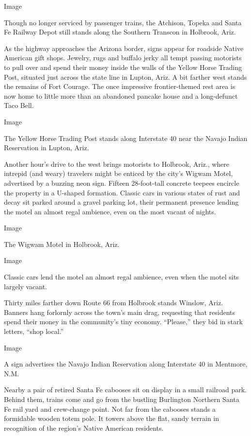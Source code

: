 Image

Though no longer serviced by passenger trains, the Atchison, Topeka and
Santa Fe Railway Depot still stands along the Southern Transcon in
Holbrook, Ariz.

As the highway approaches the Arizona border, signs appear for roadside
Native American gift shops. Jewelry, rugs and buffalo jerky all tempt
passing motorists to pull over and spend their money inside the walls of
the Yellow Horse Trading Post, situated just across the state line in
Lupton, Ariz. A bit farther west stands the remains of Fort Courage. The
once impressive frontier-themed rest area is now home to little more
than an abandoned pancake house and a long-defunct Taco Bell.

Image

The Yellow Horse Trading Post stands along Interstate 40 near the Navajo
Indian Reservation in Lupton, Ariz.

Another hour's drive to the west brings motorists to Holbrook, Ariz.,
where intrepid (and weary) travelers might be enticed by the city's
Wigwam Motel, advertised by a buzzing neon sign. Fifteen 28-foot-tall
concrete teepees encircle the property in a U-shaped formation. Classic
cars in various states of rust and decay sit parked around a gravel
parking lot, their permanent presence lending the motel an almost regal
ambience, even on the most vacant of nights.

Image

The Wigwam Motel in Holbrook, Ariz.

Image

Classic cars lend the motel an almost regal ambience, even when the
motel sits largely vacant.

Thirty miles farther down Route 66 from Holbrook stands Winslow, Ariz.
Banners hang forlornly across the town's main drag, requesting that
residents spend their money in the community's tiny economy. ``Please,''
they bid in stark letters, ``shop local.''

Image

A sign advertises the Navajo Indian Reservation along Interstate 40 in
Mentmore, N.M.

Nearby a pair of retired Santa Fe cabooses sit on display in a small
railroad park. Behind them, trains come and go from the bustling
Burlington Northern Santa Fe rail yard and crew-change point. Not far
from the cabooses stands a formidable wooden totem pole. It towers above
the flat, sandy terrain in recognition of the region's Native American
residents.

